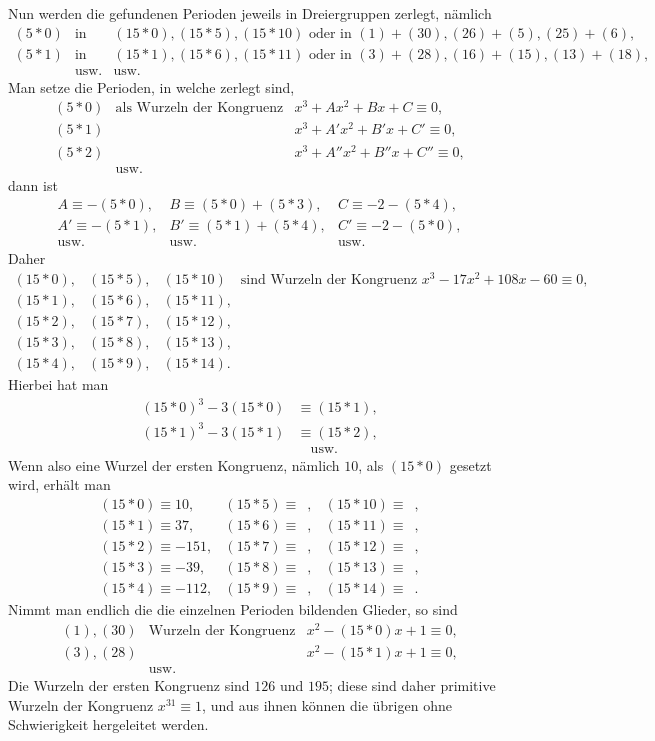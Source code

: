 \documentclass[12pt]{article}
\begin{document}
Nun werden die gefundenen Perioden jeweils in Dreiergruppen zerlegt, nämlich
\[
\begin{array}{rcl}
(5*0)&\text{in}&(15*0),(15*5),(15*10)\text{ oder in }(1)+(30),(26)+(5),(25)+(6),\\
(5*1)&\text{in}&(15*1),(15*6),(15*11)\text{ oder in }(3)+(28),(16)+(15),(13)+(18),\\
&\text{usw.}&\text{usw.}
\end{array}
\]
Man setze die Perioden, in welche zerlegt sind,
\[
\begin{array}{rcl}
(5*0)&\text{als Wurzeln der Kongruenz}&x^3+A x^2+B x+C\equiv 0,\\
(5*1)&&x^3+A'x^2+B'x+C'\equiv 0,\\
(5*2)&&x^3+A''x^2+B''x+C''\equiv 0,\\
&\text{usw.}&
\end{array}
\]
dann ist
\[
\begin{array}{lll}
A\equiv -(5*0),&B\equiv (5*0)+(5*3),&C\equiv -2-(5*4),\\
A'\equiv -(5*1),&B'\equiv (5*1)+(5*4),&C'\equiv -2-(5*0),\\
\text{usw.}&\text{usw.}&\text{usw.}
\end{array}
\]
Daher
\[
\begin{array}{lll}
(15*0),&(15*5),&(15*10)\quad\text{sind Wurzeln der Kongruenz }x^3-17x^2+108x-60\equiv 0,\\
(15*1),&(15*6),&(15*11),\\
(15*2),&(15*7),&(15*12),\\
(15*3),&(15*8),&(15*13),\\
(15*4),&(15*9),&(15*14).
\end{array}
\]
Hierbei hat man
\[
\begin{aligned}
(15*0)^3-3(15*0)&\equiv (15*1),\\
(15*1)^3-3(15*1)&\equiv (15*2),\\
&\quad\text{usw.}
\end{aligned}
\]
Wenn also eine Wurzel der ersten Kongruenz, nämlich $10$, als $(15*0)$ gesetzt wird, erhält man
\[
\begin{array}{lll}
(15*0)\equiv 10,&(15*5)\equiv \phantom{0},&(15*10)\equiv \phantom{0},\\
(15*1)\equiv 37,&(15*6)\equiv \phantom{0},&(15*11)\equiv \phantom{0},\\
(15*2)\equiv -151,&(15*7)\equiv \phantom{0},&(15*12)\equiv \phantom{0},\\
(15*3)\equiv -39,&(15*8)\equiv \phantom{0},&(15*13)\equiv \phantom{0},\\
(15*4)\equiv -112,&(15*9)\equiv \phantom{0},&(15*14)\equiv \phantom{0}.
\end{array}
\]
Nimmt man endlich die die einzelnen Perioden bildenden Glieder, so sind
\[
\begin{array}{rcl}
(1),(30)&\text{Wurzeln der Kongruenz}&x^2-(15*0)x+1\equiv 0,\\
(3),(28)&&x^2-(15*1)x+1\equiv 0,\\
&\text{usw.}&
\end{array}
\]
Die Wurzeln der ersten Kongruenz sind $126$ und $195$; diese sind daher primitive Wurzeln der Kongruenz $x^{31}\equiv 1$, und aus ihnen können die übrigen ohne Schwierigkeit hergeleitet werden.
\end{document}
